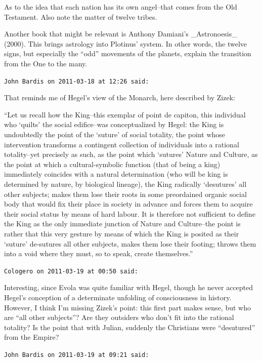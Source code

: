 \begin{footnotesize}
\begin{sffamily}
As to the idea that each nation has its own angel--that comes from the Old Testament. Also note the matter of twelve tribes.

Another book that might be relevant is Anthony Damiani's \_Astronoesis\_ (2000). This brings astrology into Plotinus' system. In other words, the twelve signs, but especially the ``odd'' movements of the planets, explain the transition from the One to the many.

\hfill

\texttt{John Bardis on 2011-03-18 at 12:26 said:}

That reminds me of Hegel's view of the Monarch, here described by Zizek:

``Let us recall how the King--this exemplar of point de capiton, this individual who `quilts' the social edifice--was conceptualized by Hegel: the King is undoubtedly the point of the `suture' of social totality, the point whose intervention transforms a contingent collection of individuals into a rational totality--yet precisely as such, as the point which `sutures' Nature and Culture, as the point at which a cultural-symbolic function (that of being a king) immediately coincides with a natural determination (who will be king is determined by nature, by biological lineage), the King radically `desutures' all other subjects; makes them lose their roots in some preordained organic social body that would fix their place in society in advance and forces them to acquire their social status by means of hard labour. It is therefore not sufficient to define the King as the only immediate junction of Nature and Culture--the point is rather that this very gesture by means of which the King is posited as their `suture' de-sutures all other subjects, makes them lose their footing; throws them into a void where they must, so to speak, create themselves.''

\hfill

\texttt{Cologero on 2011-03-19 at 00:50 said:}

Interesting, since Evola was quite familiar with Hegel, though he never accepted Hegel's conception of a determinate unfolding of consciousness in history. However, I think I'm missing Zizek's point: this first part makes sense, but who are ``all other subjects''? Are they outsiders who don't fit into the rational totality? Is the point that with Julian, suddenly the Christians were ``desutured'' from the Empire?

\hfill

\texttt{John Bardis on 2011-03-19 at 09:21 said:}


\end{sffamily}
\end{footnotesize}
